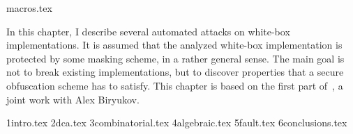 \myminitoc
{
{macros.tex}

In this chapter, I describe several automated attacks on white-box implementations. It is assumed that the analyzed white-box implementation is protected by some masking scheme, in a rather general sense. The main goal is not to break existing implementations, but to discover properties that a secure obfuscation scheme has to satisfy. This chapter is based on the first part of~\cite{OurWhitebox}, a joint work with Alex Biryukov.

{1intro.tex}
{2dca.tex}
{3combinatorial.tex}
{4algebraic.tex}
{5fault.tex}
{6conclusions.tex}

}